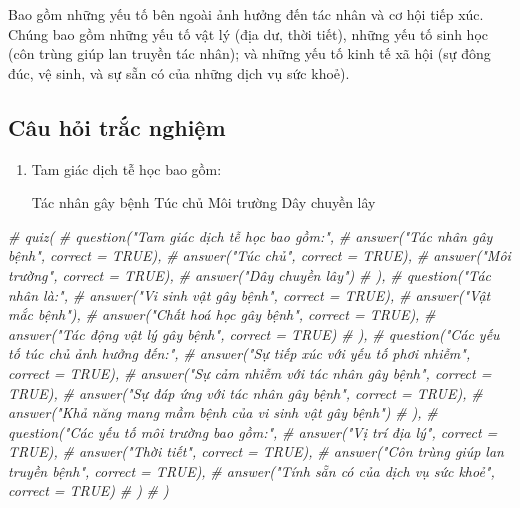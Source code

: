 \documentclass[
]{book}
\newenvironment{Shaded}{\begin{snugshade}}{\end{snugshade}}
\newcommand{\CommentTok}[1]{\textcolor[rgb]{0.56,0.35,0.01}{\textit{#1}}}
\providecommand{\tightlist}{%
  \setlength{\itemsep}{0pt}\setlength{\parskip}{0pt}}
\begin{document}
Bao gồm những yếu tố bên ngoài ảnh hưởng đến tác nhân và cơ hội tiếp xúc. Chúng bao gồm những yếu tố vật lý (địa dư, thời tiết), những yếu tố sinh học (côn trùng giúp lan truyền tác nhân); và những yếu tố kinh tế xã hội (sự đông đúc, vệ sinh, và sự sẵn có của những dịch vụ sức khoẻ).

\hypertarget{cuxe2u-hux1ecfi-trux1eafc-nghiux1ec7m}{%
\subsection{Câu hỏi trắc nghiệm}\label{cuxe2u-hux1ecfi-trux1eafc-nghiux1ec7m}}

\begin{enumerate}
\def\labelenumi{\arabic{enumi}.}
\tightlist
\item
  Tam giác dịch tễ học bao gồm:

  \hypertarget{radio_IZRJXRRFPU}{}
  {Tác nhân gây bệnh} {Túc chủ} {Môi trường} {Dây chuyền lây}
\end{enumerate}

\begin{Shaded}
\begin{Highlighting}[]
\CommentTok{\# quiz(}
\CommentTok{\#   question("Tam giác dịch tễ học bao gồm:",}
\CommentTok{\#     answer("Tác nhân gây bệnh", correct = TRUE),}
\CommentTok{\#     answer("Túc chủ", correct = TRUE),}
\CommentTok{\#     answer("Môi trường", correct = TRUE),}
\CommentTok{\#     answer("Dây chuyền lây")}
\CommentTok{\#   ),}
\CommentTok{\#   question("Tác nhân là:",}
\CommentTok{\#     answer("Vi sinh vật gây bệnh", correct = TRUE),}
\CommentTok{\#     answer("Vật mắc bệnh"),}
\CommentTok{\#     answer("Chất hoá học gây bệnh", correct = TRUE),}
\CommentTok{\#     answer("Tác động vật lý gây bệnh", correct = TRUE)}
\CommentTok{\#   ),}
\CommentTok{\#   question("Các yếu tố túc chủ ảnh hưởng đến:",}
\CommentTok{\#     answer("Sự tiếp xúc với yếu tố phơi nhiễm", correct = TRUE),}
\CommentTok{\#     answer("Sự cảm nhiễm với tác nhân gây bệnh", correct = TRUE),}
\CommentTok{\#     answer("Sự đáp ứng với tác nhân gây bệnh", correct = TRUE),}
\CommentTok{\#     answer("Khả năng mang mầm bệnh của vi sinh vật gây bệnh")}
\CommentTok{\#   ),}
\CommentTok{\#   question("Các yếu tố môi trường bao gồm:",}
\CommentTok{\#     answer("Vị trí địa lý", correct = TRUE),}
\CommentTok{\#     answer("Thời tiết", correct = TRUE),}
\CommentTok{\#     answer("Côn trùng giúp lan truyền bệnh", correct = TRUE),}
\CommentTok{\#     answer("Tính sẵn có của dịch vụ sức khoẻ", correct = TRUE)}
\CommentTok{\#   )}
\CommentTok{\# )}
\end{Highlighting}
\end{Shaded}
\end{document}
